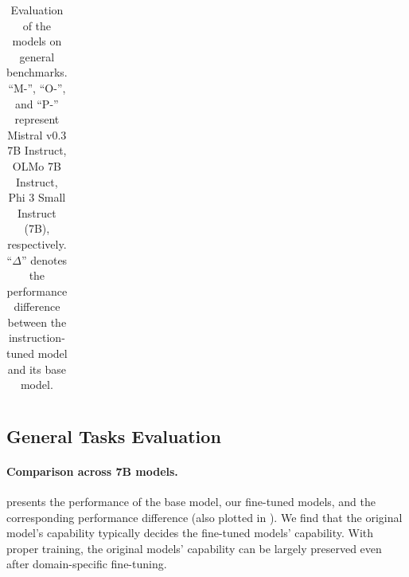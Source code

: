\documentclass[11pt]{article}
\begin{document}
\begin{table}[t]
{\begin{tabular}{cccccc}
    \end{tabular}
    }
    \caption{Evaluation of the models on general benchmarks.
    ``M-'', ``O-'', and ``P-'' represent Mistral v0.3 7B Instruct, OLMo 7B Instruct, Phi 3 Small Instruct (7B), respectively.
    ``$\Delta$'' denotes the performance difference between the instruction-tuned model and its base model.
    }
    \label{tab:general}
\end{table}

\subsection{General Tasks Evaluation}
\paragraph{Comparison across 7B models.}
 presents the performance of the base model, our fine-tuned models, and the corresponding performance difference (also plotted in ).
We find that the original model's capability typically decides the fine-tuned models' capability.
With proper training, the original models' capability can be largely preserved even after domain-specific fine-tuning.
\end{document}
